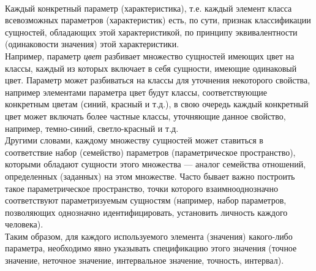 \begin{SCn}
\begin{scnsubstruct}
{            \\Каждый конкретный параметр (характеристика), т.е. каждый элемент класса всевозможных параметров (характеристик) есть, по сути, признак классификации сущностей, обладающих этой характеристикой, по принципу эквивалентности (одинаковости значения) этой характеристики.
            \\Например, параметр \textit{цвет} разбивает множество сущностей имеющих цвет на классы, каждый из которых включает в себя сущности, имеющие одинаковый цвет. Параметр может разбиваться на классы для уточнения некоторого свойства, например элементами параметра цвет будут классы, соответствующие конкретным цветам (синий, красный и т.д.), в свою очередь каждый конкретный цвет может включать более частные классы, уточняющие данное свойство, например, темно-синий, светло-красный и т.д.
            \\Другими словами, каждому множеству сущностей может ставиться в соответствие набор (семейство) параметров (параметрическое пространство), которыми обладают сущности этого множества --- аналог семейства отношений, определенных (заданных) на этом множестве. Часто бывает важно построить такое параметрическое пространство, точки которого взаимнооднозначно соответствуют параметризуемым сущностям (например, набор параметров, позволяющих однозначно идентифицировать, установить личность каждого человека).
            \\Таким образом, для каждого используемого элемента (значения) какого-либо параметра, необходимо явно указывать спецификацию этого значения (точное значение, неточное значение, интервальное значение, точность, интервал).}
      
       
       

\end{scnsubstruct}
\end{SCn}
